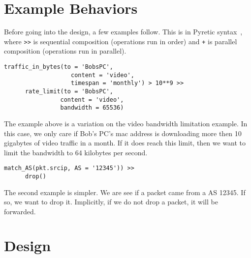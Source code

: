 \documentclass{sig-alternate}
\newcommand\tti[1]{\small\texttt{#1}\normalsize}
\newcommand\system{NetAssay}
\begin{document}
\section{Example Behaviors}
\label{sec:examples}
Before going into the design, a few examples follow. This is in Pyretic syntax~\cite{pyretic}, where \tti{>}\tti{>} is sequential composition (operations run in order) and \tti{+} is parallel composition (operations run in parallel). 

\begin{Verbatim}[fontsize=\small]
  traffic_in_bytes(to = 'BobsPC', 
                   content = 'video',
                   timespan = 'monthly') > 10**9 >>
      rate_limit(to = 'BobsPC', 
                content = 'video', 
                bandwidth = 65536)
\end{Verbatim}

The example above is a variation on the video bandwidth limitation example. In this case, we only care if Bob's PC's mac address is downloading more then 10 gigabytes of video traffic in a month. If it does reach this limit, then we want to limit the bandwidth to 64 kilobytes per second.

\begin{Verbatim}[fontsize=\small]
  match_AS(pkt.srcip, AS = '12345')) >>
      drop()
\end{Verbatim}

The second example is simpler. We are see if a packet came from a AS 12345. If so, we want to drop it. Implicitly, if we do not drop a packet, it will be forwarded.


\section{Design}

\end{document}
